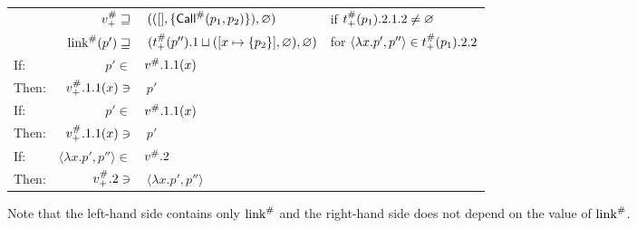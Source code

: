 \begin{center}
\begin{tabular}{|l@{\hskip2pt}r@{\hskip2pt}l@{\hskip2pt}l|}
                              & ${v}^{\#}_+\sqsupseteq$                 & $\:(([],\{{\textsf{Call}}^{\#}(p_1,p_2)\}),\varnothing)$                                      & if ${t}^{\#}_+(p_1).2.1.2\neq\varnothing$                  \\
                              & ${\text{link}}^{\#}(p')\sqsupseteq$             & $\:({t}^{\#}_+(p'').1\sqcup([x\mapsto\{p_2\}],\varnothing),\varnothing)$          & for $\langle\lambda x.p',p''\rangle\in{t}^{\#}_+(p_1).2.2$ \\
    \hline
    If:                       & $p'\in$                                & ${v}^{\#}.1.1(x)$                                                                    &                                                              \\
    Then:                     & ${v}^{\#}_+.1.1(x)\ni$                  & $\:p'$                                                                              &                                                              \\
    \hline
    If:                       & $p'\in$                                & ${v}^{\#}.1.1(x)$                                                                    &                                                              \\
    Then:                     & ${v}^{\#}_+.1.1(x)\ni$                  & $\:p'$                                                                              &                                                              \\
    \hline
    If:                       & $\langle\lambda x.p',p''\rangle\in$    & ${v}^{\#}.2$                                                                         &                                                              \\
    Then:                     & ${v}^{\#}_+.2\ni$                       & $\:\langle\lambda x.p',p''\rangle$                                                  &                                                              \\
    \hline
  \end{tabular}
\end{center}
Note that the left-hand side contains only ${\text{link}}^{\#}$ and the right-hand side does not depend on the value of ${\text{link}}^{\#}$.

